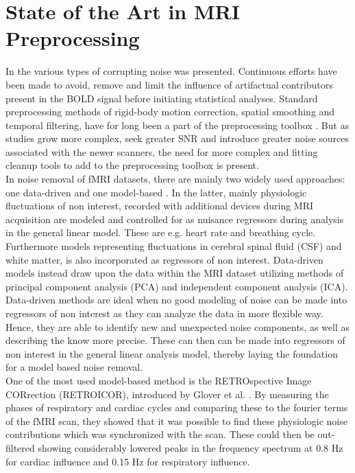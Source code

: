 \section{State of the Art in MRI Preprocessing} \label{art}

In  the various types of corrupting noise was presented. Continuous efforts have been made to avoid, remove and limit the influence of artifactual contributors present in the BOLD signal before initiating statistical analyses. Standard preprocessing methods of rigid-body motion correction, spatial smoothing and temporal filtering, have for long been a part of the preprocessing toolbox \cite{Poldrack2011,Salimi-Khorshidi2014}. But as studies grow more complex, seek greater SNR and introduce greater noise sources associated with the newer scanners, the need for more complex and fitting cleanup tools to add to the preprocessing toolbox is present. \cite{Wood2012,Liu2006} \\
In noise removal of fMRI datasets, there are mainly two widely used approaches: one data-driven and one model-based \cite{Salimi-Khorshidi2014,Iraji2016}. In the latter, mainly physiologic fluctuations of non interest, recorded with additional devices during MRI acquisition are modeled and controlled for as nuisance regressors during analysis in the general linear model. These are e.g. heart rate and breathing cycle. Furthermore models representing fluctuations in cerebral spinal fluid (CSF) and white matter, is also incorporated as regressors of non interest. \cite{Salimi-Khorshidi2014,Iraji2016,Monti2011} Data-driven models instead draw upon the data within the MRI dataset utilizing methods of principal component analysis (PCA) and independent component analysis (ICA). Data-driven methods are ideal when no good modeling of noise can be made into regressors of non interest as they can analyze the data in more flexible way. Hence, they are able to identify new and unexpected noise components, as well as describing the know more precise. These can then can be made into regressors of non interest in the general linear analysis model, thereby laying the foundation for a model based noise removal. \cite{Iraji2016} \\
One of the most used model-based method is the RETROspective Image CORrection (RETROICOR), introduced by Glover et al. \cite{Glover2000}. By measuring the phases of respiratory and cardiac cycles and comparing these to the fourier terms of the fMRI scan, they showed that it was possible to find these physiologic noise contributions which was synchronized with the scan. These could then be out-filtered showing considerably lowered peaks in the frequency spectrum at 0.8 Hz for cardiac influence and 0.15 Hz for respiratory influence. \cite{Glover2000} \\
